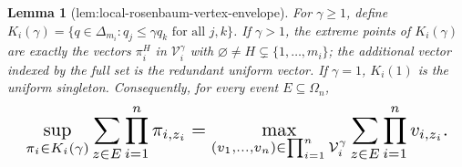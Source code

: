\documentclass{article}
\newtheorem{lemma}{Lemma}
\begin{document}
\begin{lemma}[lem:local-rosenbaum-vertex-envelope]\label{lem:local-rosenbaum-vertex-envelope}
For \(\gamma\ge1\), define \(K_i(\gamma)=\{q\in\Delta_{m_i}:q_j\le\gamma q_k\text{ for all }j,k\}\). If \(\gamma>1\), the extreme points of \(K_i(\gamma)\) are exactly the vectors \(\pi_i^H\) in \(\mathcal V_i^\gamma\) with \(\varnothing\ne H\subsetneq\{1,\ldots,m_i\}\); the additional vector indexed by the full set is the redundant uniform vector. If \(\gamma=1\), \(K_i(1)\) is the uniform singleton. Consequently, for every event \(E\subseteq\Omega_n\), \[
\makebox[\linewidth][c]{\resizebox{0.98\linewidth}{!}{\par\noindent \makebox[\linewidth][c]{\resizebox{0.98\linewidth}{!}{\(\displaystyle \displaystyle \sup_{\pi_i\in K_i(\gamma)}\sum_{z\in E}\prod_{i=1}^n\pi_{i,z_i} =\max_{(v_1,\ldots,v_n)\in\prod_{i=1}^n\mathcal V_i^\gamma}\sum_{z\in E}\prod_{i=1}^n v_{i,z_i}.\)}}\par\noindent}}
\]
\end{lemma}
\end{document}
